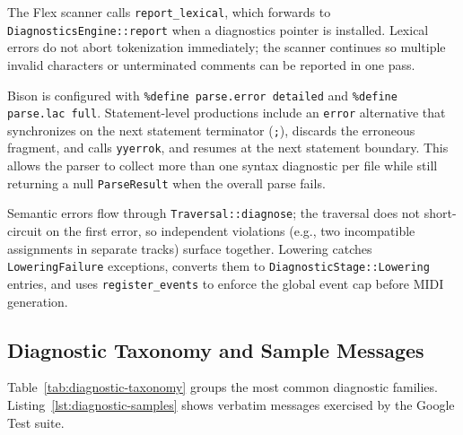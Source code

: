 The Flex scanner calls \texttt{report\_lexical}, which forwards to
\texttt{DiagnosticsEngine::report} when a diagnostics pointer is installed.
Lexical errors do not abort tokenization immediately; the scanner continues so multiple invalid characters or
unterminated comments can be reported in one pass.

Bison is configured with \texttt{\%define parse.error detailed} and \texttt{\%define parse.lac full}.
Statement-level productions include an \texttt{error} alternative that synchronizes on the next statement terminator
(\texttt{;}), discards the erroneous fragment, and calls
\texttt{yyerrok}, and resumes at the next statement boundary.
This allows the parser to collect more than one syntax diagnostic per file while still returning a null
\texttt{ParseResult} when the overall parse fails.

Semantic errors flow through \texttt{Traversal::diagnose}; the traversal does not short-circuit on the first error, so
independent violations (e.g., two incompatible assignments in separate tracks) surface together.
Lowering catches \texttt{LoweringFailure} exceptions, converts them to
\texttt{DiagnosticStage::Lowering} entries, and uses \texttt{register\_events} to enforce the global event cap before
MIDI generation.

\subsection{Diagnostic Taxonomy and Sample Messages}\label{detail-subsec:diagnostic-taxonomy}

Table~\ref{tab:diagnostic-taxonomy} groups the most common diagnostic families.
Listing~\ref{lst:diagnostic-samples} shows verbatim messages exercised by the Google Test suite.

